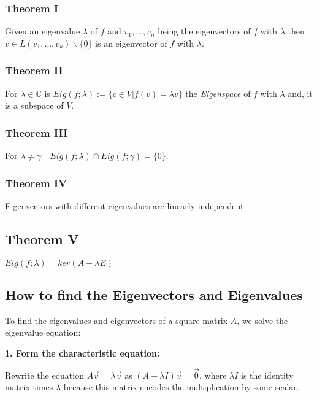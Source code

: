 \subsubsection{Theorem I}

Given an eigenvalue \(\lambda\) of \(f\) and \(v_1, \dots, v_n\) being the eigenvectors of \(f\) with \(\lambda\) 
then \(v \in L(v_1, \dots, v_k) \backslash \{0\}\) is an eigenvector of \(f\) with \(\lambda\).
\vspace{\baselineskip}

\subsubsection{Theorem II}

For \(\lambda \in \mathbb{C}\) is \(Eig(f;\lambda):= \{c \in V | f(v) = \lambda v\}\) the \emph{Eigenspace} of 
\(f\) with \(\lambda\) and, it is a subspace of \(V\).

\subsubsection{Theorem III}

For \(\lambda \ne \gamma \quad Eig(f;\lambda) \cap Eig(f;\gamma) = \{0\}\).

\subsubsection{Theorem IV}

Eigenvectors with different eigenvalues are linearly independent.

\subsection{Theorem V}

\(Eig(f;\lambda) = ker(A - \lambda E)\)


\subsection{How to find the Eigenvectors and Eigenvalues}

To find the eigenvalues and eigenvectors of a square matrix \(A\), we solve the eigenvalue equation:
\vspace{\baselineskip}

\textbf{1. Form the characteristic equation:}

    Rewrite the equation \(A\vec{v} = \lambda\vec{v}\) as 
    \((A - \lambda I)\vec{v} = \vec{0}\), where \(\lambda I\) is the identity matrix times \(\lambda\) because 
    this matrix encodes the multiplication by some scalar. 
    
